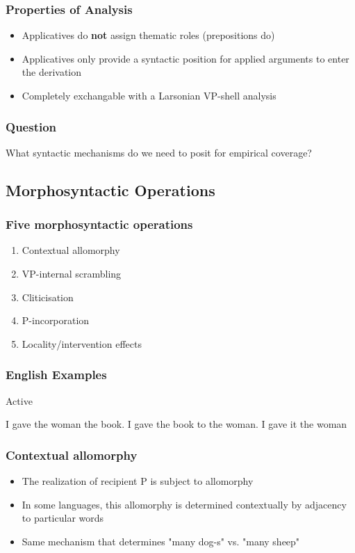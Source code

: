\documentclass{beamer}
\begin{document}
\begin{frame}
	\frametitle{Properties of Analysis}
	\begin{itemize}
		\item Applicatives do \textbf{not} assign thematic roles (prepositions do)
		\item Applicatives only provide a syntactic position for applied arguments to enter the derivation
		\item Completely exchangable with a Larsonian VP-shell analysis \citep{Larson.1988}
	\end{itemize}
\end{frame}

\begin{frame}
	\frametitle{Question}
	\vfill
	\Large
		What syntactic mechanisms do we need to posit for empirical coverage?
	\vfill
\end{frame}
\subsection{Morphosyntactic Operations}
\begin{frame}
	\frametitle{Five morphosyntactic operations}
	\begin{enumerate}
		\item Contextual allomorphy
		\item VP-internal scrambling
		\item Cliticisation
		\item P-incorporation
		\item Locality/intervention effects
	\end{enumerate}
\end{frame}

\begin{frame}
	\frametitle{English Examples}
\begin{exe}
	\ex Active
	\begin{xlist}
		\ex I gave the woman the book.
		\ex I gave the book to the woman.
		\ex I gave it the woman
	\end{xlist}
\end{exe}
\end{frame}

\begin{frame}
	\frametitle{Contextual allomorphy}
	\begin{itemize}
		\item The realization of recipient P is subject to allomorphy
		\item In some languages, this allomorphy is determined contextually by adjacency to particular words
		\item Same mechanism that determines "many dog-s" vs. "many sheep"
	\end{itemize}
\end{frame}
\end{document}
